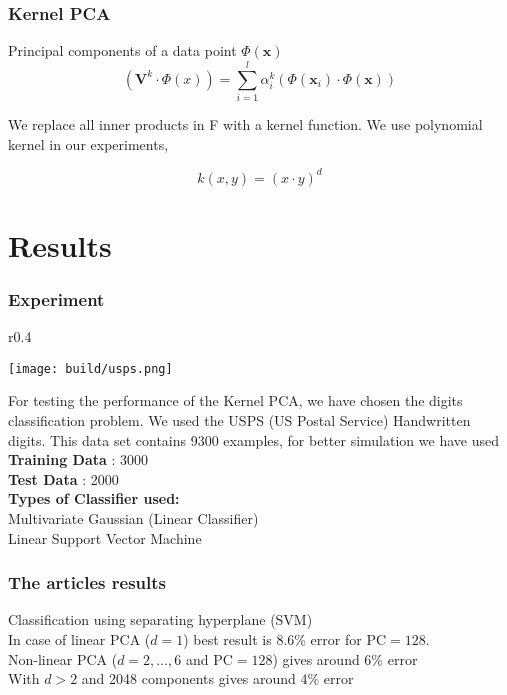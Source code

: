 \documentclass{beamer}
\begin{document}
\begin{frame}
  \frametitle{Kernel PCA} %

    Principal components of a data point $\Phi(\textbf{x})$
    \begin{equation} \label{eq:components_extraction}
        (\textbf{V}^k \cdot \Phi(x)) =  \sum\limits_{i=1}^{l} \alpha_i^k (\Phi(\textbf{x}_i) \cdot \Phi(\textbf{x}))
    \end{equation}
    
We replace all inner products in F with a kernel function. We use polynomial kernel in our experiments,

$$
k(x,y) = (x\cdot y)^d
$$    
    
\end{frame}

\section[Results]{Results} %
\begin{frame}
    \frametitle{Experiment} %
        \begin{wrapfigure}{r}{0.4\textwidth}
  \begin{center}
    \texttt{[image: build/usps.png]}
  \end{center}
\end{wrapfigure}
    For testing the performance of the Kernel PCA, we have chosen the digits classification problem. We used the USPS (US Postal Service) Handwritten digits. This data set contains 9300 examples, for better simulation we have used\\

    \vspace{0.5cm}
    \textbf{Training Data} : 3000\\
    \textbf{Test Data}   : 2000 \\

\vspace{0.5cm}
\textbf{Types of Classifier used:}\\
Multivariate Gaussian (Linear Classifier)\\
Linear Support Vector Machine
\end{frame}

\begin{frame}
\frametitle{The articles results}
Classification using separating hyperplane (SVM)\\
\vspace{0.5cm}
In case of linear PCA ($d=1$) best result is 8.6\% error for PC$=128$.\\
Non-linear PCA ($d=2,\dots,6$ and PC$=128$) gives around 6\% error\\
With $d>2$ and 2048 components gives around 4\% error\\
\end{frame}
\end{document}
